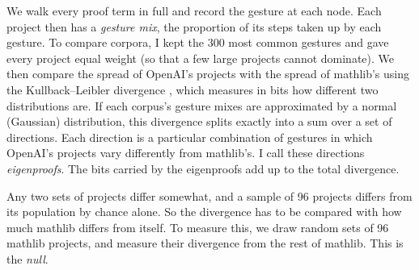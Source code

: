 \documentclass{article}
\begin{document}
We walk every proof term in full and record the gesture at each node. Each project then has a \textit{gesture mix},
the proportion of its steps taken up by each gesture. To compare corpora, I kept the 300 most common gestures and gave
every project equal weight (so that a few large projects cannot dominate). We then compare the spread of OpenAI's
projects with the spread of mathlib's using the Kullback--Leibler divergence \textit{\parencite{kullback1951}}, which measures in bits how different two
distributions are. If each corpus's gesture mixes are approximated by a normal (Gaussian) distribution, this divergence splits exactly into a sum over a set of directions.
Each direction is a particular combination of gestures in which OpenAI's projects vary differently from mathlib's. I
call these directions \textit{eigenproofs}. The bits carried by the eigenproofs add up to the total divergence.

Any two sets of projects differ somewhat, and a sample of 96 projects differs from its population by chance alone. So
the divergence has to be compared with how much mathlib differs from itself. To measure this, we draw random sets of 96 mathlib
projects, and measure their divergence from the rest of mathlib. This is the \textit{null}.
\end{document}
